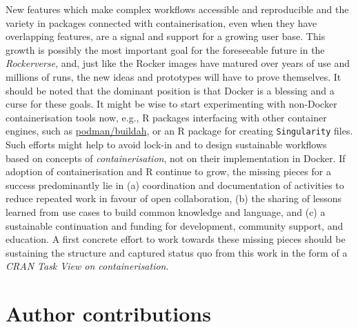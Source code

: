New features which make complex workflows accessible and reproducible
and the variety in packages connected with containerisation, even when
they have overlapping features, are a signal and support for a growing
user base. This growth is possibly the most important goal for the
foreseeable future in the \emph{Rockerverse}, and, just like the Rocker
images have matured over years of use and millions of runs, the new
ideas and prototypes will have to prove themselves. It should be noted
that the dominant position is that Docker is a blessing and a curse for
these goals. It might be wise to start experimenting with non-Docker
containerisation tools now, e.g., R packages interfacing with other
container engines, such as
\href{https://github.com/containers/libpod}{podman/buildah}, or an R
package for creating \texttt{Singularity} files. Such efforts might help
to avoid lock-in and to design sustainable workflows based on concepts
of \emph{containerisation}, not on their implementation in Docker. If
adoption of containerisation and R continue to grow, the missing pieces
for a success predominantly lie in (a) coordination and documentation of
activities to reduce repeated work in favour of open collaboration, (b)
the sharing of lessons learned from use cases to build common knowledge
and language, and (c) a sustainable continuation and funding for
development, community support, and education. A first concrete effort
to work towards these missing pieces should be sustaining the structure
and captured status quo from this work in the form of a \emph{CRAN Task
View on containerisation}.

\hypertarget{author-contributions}{%
\section{Author contributions}\label{author-contributions}}

